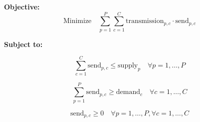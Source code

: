 \documentclass{article}
\begin{document}
\textbf{Objective:}
\[
\text{Minimize} \quad \sum_{p=1}^{P} \sum_{c=1}^{C} \text{transmission}_{p,c} \cdot \text{send}_{p,c}
\]

\textbf{Subject to:}

\[
\sum_{c=1}^{C} \text{send}_{p,c} \leq \text{supply}_{p} \quad \forall p = 1, \ldots, P
\]

\[
\sum_{p=1}^{P} \text{send}_{p,c} \geq \text{demand}_{c} \quad \forall c = 1, \ldots, C
\]

\[
\text{send}_{p,c} \geq 0 \quad \forall p = 1, \ldots, P, \forall c = 1, \ldots, C
\]
\end{document}

